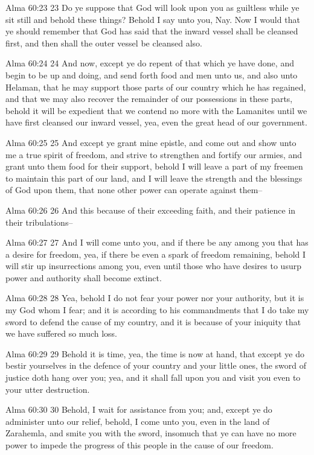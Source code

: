Alma 60:23
 23 Do ye suppose that God will look upon you as guiltless while
ye sit still and behold these things? Behold I say unto you,
Nay. Now I would that ye should remember that God has said that
the inward vessel shall be cleansed first, and then shall the
outer vessel be cleansed also.

Alma 60:24
 24 And now, except ye do repent of that which ye have done, and
begin to be up and doing, and send forth food and men unto us,
and also unto Helaman, that he may support those parts of our
country which he has regained, and that we may also recover the
remainder of our possessions in these parts, behold it will be
expedient that we contend no more with the Lamanites until we
have first cleansed our inward vessel, yea, even the great head
of our government.

Alma 60:25
 25 And except ye grant mine epistle, and come out and show unto
me a true spirit of freedom, and strive to strengthen and fortify
our armies, and grant unto them food for their support, behold I
will leave a part of my freemen to maintain this part of our
land, and I will leave the strength and the blessings of God upon
them, that none other power can operate against them--

Alma 60:26
 26 And this because of their exceeding faith, and their patience
in their tribulations--

Alma 60:27
 27 And I will come unto you, and if there be any among you that
has a desire for freedom, yea, if there be even a spark of
freedom remaining, behold I will stir up insurrections among you,
even until those who have desires to usurp power and authority
shall become extinct.

Alma 60:28
 28 Yea, behold I do not fear your power nor your authority, but
it is my God whom I fear; and it is according to his commandments
that I do take my sword to defend the cause of my country, and it
is because of your iniquity that we have suffered so much loss.

Alma 60:29
 29 Behold it is time, yea, the time is now at hand, that except
ye do bestir yourselves in the defence of your country and your
little ones, the sword of justice doth hang over you; yea, and it
shall fall upon you and visit you even to your utter destruction.

Alma 60:30
 30 Behold, I wait for assistance from you; and, except ye do
administer unto our relief, behold, I come unto you, even in the
land of Zarahemla, and smite you with the sword, insomuch that ye
can have no more power to impede the progress of this people in
the cause of our freedom.

